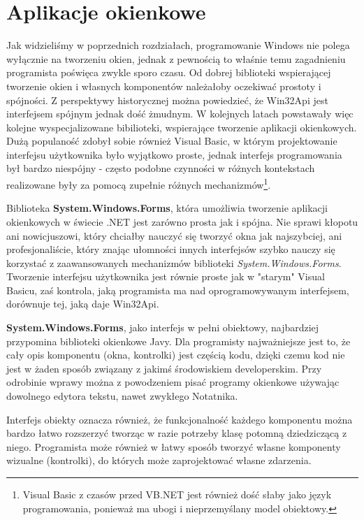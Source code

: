 ﻿\section{Aplikacje okienkowe}

Jak widzieliśmy w poprzednich rozdziałach, programowanie Windows nie polega wyłącznie na tworzeniu okien,
jednak z pewnością to właśnie temu zagadnieniu programista poświęca zwykle sporo czasu. 
Od dobrej biblioteki wspierającej tworzenie okien i własnych komponentów należałoby oczekiwać prostoty
i spójności. Z perspektywy historycznej można powiedzieć, że Win32Api jest interfejsem spójnym jednak dość
żmudnym. W kolejnych latach powstawały więc kolejne wyspecjalizowane bibilioteki, 
wspierające tworzenie aplikacji okienkowych. Dużą populaność zdobył sobie również Visual Basic, 
w którym projektowanie interfejsu użytkownika było wyjątkowo proste, jednak interfejs programowania
był bardzo niespójny - często podobne czynności w różnych kontekstach realizowane były za pomocą
zupełnie różnych mechanizmów\footnote{Visual Basic z czasów przed VB.NET jest również dość słaby jako
język programowania, ponieważ ma ubogi i nieprzemyślany model obiektowy.}. 

Biblioteka {\bf System.Windows.Forms}, która umożliwia tworzenie aplikacji okienkowych w świecie .NET
jest zarówno prosta jak i spójna. Nie sprawi kłopotu ani nowicjuszowi, który chciałby nauczyć się 
tworzyć okna jak najszybciej, ani profesjonaliście, który znając ułomności innych interfejsów szybko
nauczy się korzystać z zaawansowanych mechanizmów biblioteki {\em System.Windows.Forms}. Tworzenie
interfejsu użytkownika jest równie proste jak w "starym" Visual Basicu, zaś kontrola, jaką programista
ma nad oprogramowywanym interfejsem, dorównuje tej, jaką daje Win32Api.

{\bf System.Windows.Forms}, jako interfejs w pełni obiektowy, najbardziej przypomina biblioteki
okienkowe Javy. Dla programisty najważniejsze jest to, że cały opis komponentu (okna, kontrolki) jest
częścią kodu, dzięki czemu kod nie jest w żaden sposób związany z jakimś środowiskiem developerskim.
Przy odrobinie wprawy można z powodzeniem pisać programy okienkowe używając dowolnego edytora tekstu,
nawet zwykłego Notatnika.

Interfejs obiekty oznacza również, że funkcjonalność każdego komponentu można bardzo łatwo rozszerzyć
tworząc w razie potrzeby klasę potomną dziedziczącą z niego. Programista może również w łatwy sposób
tworzyć własne komponenty wizualne (kontrolki), do których może zaprojektować własne zdarzenia. 






